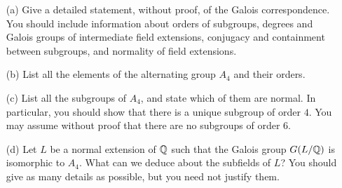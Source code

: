 \documentclass[a4paper]{article}
\begin{document}
\begin{problem}%
 \begin{itemize}
  \item[(a)] Give a detailed statement, without proof, of the Galois
   correspondence.   You should include information about orders of
   subgroups, degrees and Galois groups of intermediate field
   extensions, conjugacy and containment between subgroups, and
   normality of field extensions. 
  \item[(b)] List all the elements of the alternating group $A_4$ and
   their orders. 
  \item[(c)] List all the subgroups of $A_4$, and state which of them
   are normal.  In particular, you should show that there is a unique
   subgroup of order $4$.  You may assume without proof that there are
   no subgroups of order $6$. 
  \item[(d)] Let $L$ be a normal extension of ${\mathbb{Q}}$ such that the
   Galois group $G(L/{\mathbb{Q}})$ is isomorphic to $A_4$.  What can we deduce
   about the subfields of $L$?  You should give as many details as
   possible, but you need not justify them.  
 \end{itemize}
\end{problem}
\end{document}
